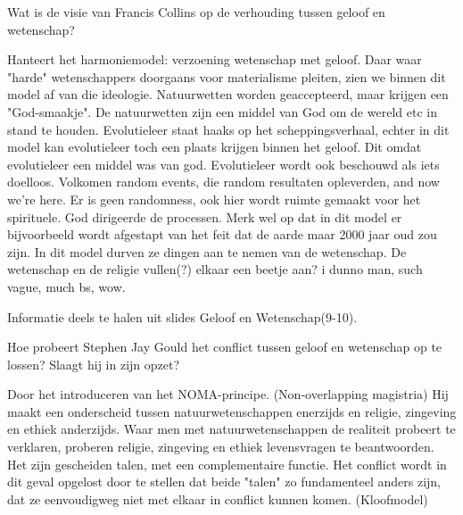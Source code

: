 \documentclass[main.tex]{subfiles}
\begin{document}
\begin{examenvraag}
    \begin{vraag}
        Wat is de visie van Francis Collins op de verhouding tussen geloof en wetenschap?
    \end{vraag}			
    			
    \begin{antwoord}
    	Hanteert het harmoniemodel: verzoening wetenschap met geloof.
    	Daar waar "harde" wetenschappers doorgaans voor materialisme pleiten, zien we binnen dit model af van die ideologie. 
    	Natuurwetten worden geaccepteerd, maar krijgen een "God-smaakje". De natuurwetten zijn een middel van God om de wereld etc in stand te houden. 
    	Evolutieleer staat haaks op het scheppingsverhaal, echter in dit model kan evolutieleer toch een plaats krijgen binnen het geloof.
    	Dit omdat evolutieleer een middel was van god.
    	Evolutieleer wordt ook beschouwd als iets doelloos. Volkomen random events, die random resultaten opleverden,  and now we're here. 
    	Er is geen randomness, ook hier wordt ruimte gemaakt voor het spirituele. 
    	God dirigeerde de processen.
    	Merk wel op dat in dit model er bijvoorbeeld wordt afgestapt van het feit dat de aarde maar 2000 jaar oud zou zijn. 
    	In dit model durven ze dingen aan te nemen van de wetenschap.
    	De wetenschap en de religie vullen(?) elkaar een beetje aan? i dunno man, such vague, much bs,  wow.
    	
    	Informatie deels te halen uit slides Geloof en Wetenschap(9-10).
    	
    \end{antwoord}
\end{examenvraag}


\begin{examenvraag}
    \begin{vraag}
        Hoe probeert Stephen Jay Gould het conflict tussen geloof en wetenschap op te lossen? Slaagt hij in zijn opzet?
    \end{vraag}

    \begin{antwoord}
        Door het introduceren van het NOMA-principe. (Non-overlapping magistria) 
        Hij maakt een onderscheid tussen natuurwetenschappen enerzijds en religie, zingeving en ethiek anderzijds.
        Waar men met natuurwetenschappen de realiteit probeert te verklaren, proberen religie, zingeving en ethiek 		   levensvragen te beantwoorden. 
        Het zijn gescheiden talen, met een complementaire functie.
        Het conflict wordt in dit geval opgelost door te stellen dat beide "talen" zo fundamenteel anders zijn, dat ze eenvoudigweg niet met elkaar in conflict kunnen komen. (Kloofmodel)
    \end{antwoord}
\end{examenvraag}
\end{document}
